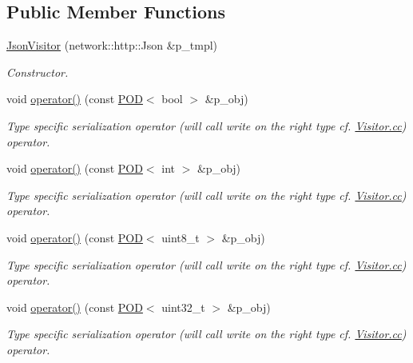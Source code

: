 \subsection*{Public Member Functions}
\begin{DoxyCompactItemize}
\item 
\hyperlink{classxtd_1_1servers_1_1param_1_1JsonVisitor_a87e4c626ded6951d1ee930d25229e8b4}{Json\+Visitor} (network\+::http\+::\+Json \&p\+\_\+tmpl)
\begin{DoxyCompactList}\small\item\em Constructor. \end{DoxyCompactList}\item 
void \hyperlink{classxtd_1_1servers_1_1param_1_1JsonVisitor_a95fa5ae6b560745f24200cec3b4c899a}{operator()} (const \hyperlink{classxtd_1_1servers_1_1param_1_1POD}{P\+OD}$<$ bool $>$ \&p\+\_\+obj)
\begin{DoxyCompactList}\small\item\em Type specific serialization operator (will call write on the right type cf. \hyperlink{Visitor_8cc}{Visitor.\+cc}) operator. \end{DoxyCompactList}\item 
void \hyperlink{classxtd_1_1servers_1_1param_1_1JsonVisitor_a1813b3c21a65b66ff441f29d0f51ccc3}{operator()} (const \hyperlink{classxtd_1_1servers_1_1param_1_1POD}{P\+OD}$<$ int $>$ \&p\+\_\+obj)
\begin{DoxyCompactList}\small\item\em Type specific serialization operator (will call write on the right type cf. \hyperlink{Visitor_8cc}{Visitor.\+cc}) operator. \end{DoxyCompactList}\item 
void \hyperlink{classxtd_1_1servers_1_1param_1_1JsonVisitor_a1f69e5ceb9d95168d4725d3949636682}{operator()} (const \hyperlink{classxtd_1_1servers_1_1param_1_1POD}{P\+OD}$<$ uint8\+\_\+t $>$ \&p\+\_\+obj)
\begin{DoxyCompactList}\small\item\em Type specific serialization operator (will call write on the right type cf. \hyperlink{Visitor_8cc}{Visitor.\+cc}) operator. \end{DoxyCompactList}\item 
void \hyperlink{classxtd_1_1servers_1_1param_1_1JsonVisitor_af7d283dea375905cd4b93497123c4f80}{operator()} (const \hyperlink{classxtd_1_1servers_1_1param_1_1POD}{P\+OD}$<$ uint32\+\_\+t $>$ \&p\+\_\+obj)
\begin{DoxyCompactList}\small\item\em Type specific serialization operator (will call write on the right type cf. \hyperlink{Visitor_8cc}{Visitor.\+cc}) operator. \end{DoxyCompactList}\item 

\end{DoxyCompactItemize}
